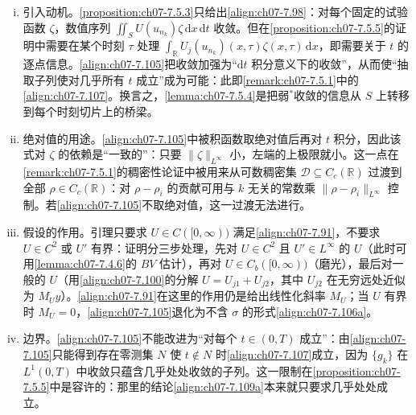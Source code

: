 \documentclass[../../main.tex]{subfiles}%
\begin{document}
\begin{remark}\label{remark:ch07-7.5.4动机}
\begin{enumerate}[(i)]
\item 引入动机。\cref{proposition:ch07-7.5.3}只给出\eqref{align:ch07-7.98}：对每个固定的试验函数 $\zeta$，数值序列 $\iint_SU(u_{n_k})\zeta\,\mathrm{d}x\,\mathrm{d}t$ 收敛。但在\cref{proposition:ch07-7.5.5}的证明中需要在某个时刻 $\tau$ 处理 $\int_{\mathbb{R}}U_j(u_{n_k})(x,\tau)\zeta(x,\tau)\,\mathrm{d}x$，即需要关于 $t$ 的逐点信息。\eqref{align:ch07-7.105}把收敛加强为“$\mathrm{d}t$ 积分意义下的收敛”，从而使“抽取子列使对几乎所有 $t$ 成立”成为可能：此即\cref{remark:ch07-7.5.1}中的\eqref{align:ch07-7.107}。换言之，\cref{lemma:ch07-7.5.4}是把弱$^*$收敛的信息从 $S$ 上转移到每个时刻切片上的桥梁。
\item 绝对值的用途。\eqref{align:ch07-7.105}中被积函数取绝对值后再对 $t$ 积分，因此该式对 $\zeta$ 的依赖是“一致的”：只要 $\|\zeta\|_{L^\infty}$ 小，左端的上极限就小。这一点在\cref{remark:ch07-7.5.1}的稠密性论证中被用来从可数稠密集 $\mathcal{D}\subseteq C_c(\mathbb{R})$ 过渡到全部 $\rho\in C_c(\mathbb{R})$：对 $\rho-\rho_i$ 的贡献可用与 $k$ 无关的常数乘 $\|\rho-\rho_i\|_{L^\infty}$ 控制。若\eqref{align:ch07-7.105}不取绝对值，这一过渡无法进行。
\item 假设的作用。引理只要求 $U\in C([0,\infty))$ 满足\eqref{align:ch07-7.91}，不要求 $U\in C^2$ 或 $U'$ 有界：证明分三步处理，先对 $U\in C^2$ 且 $U'\in L^\infty$ 的 $U$（此时可用\cref{lemma:ch07-7.4.6}的 $BV$ 估计），再对 $U\in C_b([0,\infty))$（磨光），最后对一般的 $U$（用\eqref{align:ch07-7.100}的分解 $U=U_{j1}+U_{j2}$，其中 $U_{j2}$ 在无穷远处近似为 $M_Uy$）。\eqref{align:ch07-7.91}在这里的作用仍是给出线性化斜率 $M_U$；当 $U$ 有界时 $M_U=0$，\eqref{align:ch07-7.105}退化为不含 $\sigma$ 的形式\eqref{align:ch07-7.106a}。
\item 边界。\eqref{align:ch07-7.105}不能改进为“对每个 $t\in(0,T)$ 成立”：由\eqref{align:ch07-7.105}只能得到存在零测集 $N$ 使 $t\notin N$ 时\eqref{align:ch07-7.107}成立，因为 $\{g_k\}$ 在 $L^1(0,T)$ 中收敛只蕴含几乎处处收敛的子列。这一限制在\cref{proposition:ch07-7.5.5}中是容许的：那里的结论\eqref{align:ch07-7.109a}本来就只要求几乎处处成立。
\end{enumerate}
\end{remark}
\end{document}
